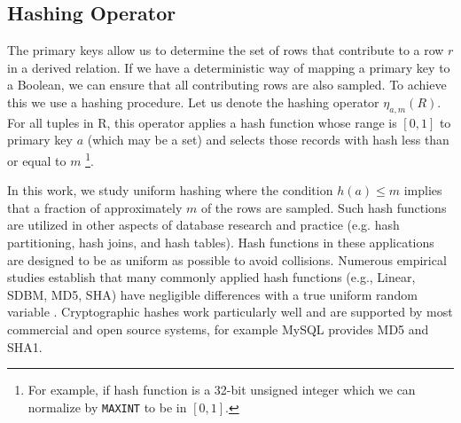 \subsection{Hashing Operator}
\label{push}
The primary keys allow us to determine the set of rows that contribute to a row $r$ in a derived relation.
If we have a deterministic way of mapping a primary key to a Boolean, we can ensure that all contributing rows are also sampled. 
To achieve this we use a hashing procedure.
Let us denote the hashing operator $\eta_{a, m}(R)$. 
For all tuples in R, this operator applies a hash function whose range is $[0,1]$ to primary key $a$ (which may be a set) and selects those records with hash less than or equal to $m$ \footnote{\scriptsize For example, if hash function is a 32-bit unsigned integer which we can normalize by \texttt{MAXINT} to be in $[0,1]$.}.

In this work, we study uniform hashing where the condition $h(a) \le m$ implies that a fraction of approximately $m$ of the rows are sampled.
Such hash functions are utilized in other aspects of database research and practice (e.g. hash partitioning, hash joins, and hash tables).
Hash functions in these applications are designed to be as uniform as possible to avoid collisions.
Numerous empirical studies establish that many commonly applied hash functions (e.g., Linear, SDBM, MD5, SHA) have negligible differences with a true uniform random variable \cite{henke2009empirical, l2007testu01}.
Cryptographic hashes work particularly well and are supported by most commercial and open source systems, for example MySQL provides MD5 and SHA1.


